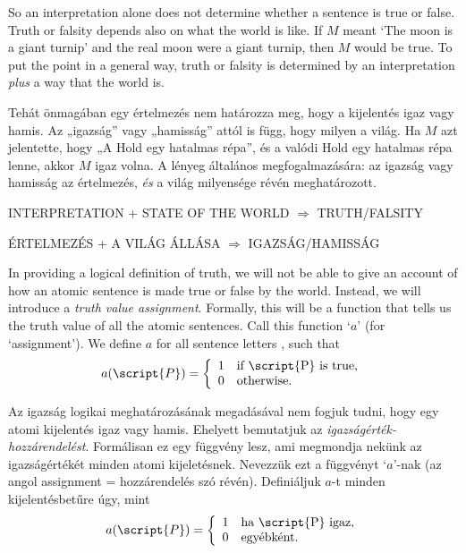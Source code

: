 So an interpretation alone does not determine whether a sentence is true or false. Truth or falsity depends also on what the world is like. If $M$ meant `The moon is a giant turnip' and the real moon were a giant turnip, then $M$ would be true. To put the point in a general way, truth or falsity is determined by an interpretation \emph{plus} a way that the world is.

Tehát önmagában egy értelmezés nem határozza meg, hogy a kijelentés igaz vagy hamis. Az „igazság” vagy „hamisság” attól is függ, hogy milyen a világ. Ha $M$ azt jelentette, hogy „A Hold egy hatalmas répa”, és a valódi Hold egy hatalmas répa lenne, akkor $M$ igaz volna. A lényeg általános megfogalmazására: az igazság vagy hamisság az értelmezés, \emph{és} a világ milyensége révén meghatározott.

\begin{center}
INTERPRETATION + STATE OF THE WORLD $\Longrightarrow$ TRUTH/FALSITY
\end{center}

\begin{center}
ÉRTELMEZÉS + A VILÁG ÁLLÁSA $\Longrightarrow$ IGAZSÁG/HAMISSÁG
\end{center}

In providing a logical definition of truth, we will not be able to give an account of how an atomic sentence is made true or false by the world. Instead, we will introduce a \emph{truth value assignment}. Formally, this will be a function that tells us the truth value of all the atomic sentences. Call this function `$a$' (for `assignment'). We define $a$ for all sentence letters , such that
\begin{displaymath}
a(\script{P}) =
\left\{
	\begin{array}{ll}
	1 & \mbox{if \script{P} is true},\\
	0 & \mbox{otherwise.}
	\end{array}
\right.
\end{displaymath}

Az igazság logikai meghatározásának megadásával nem fogjuk tudni, hogy egy atomi kijelentés igaz vagy hamis. Ehelyett bemutatjuk az \emph{igazságérték-hozzárendelést}. Formálisan ez egy függvény lesz, ami megmondja nekünk az igazságértékét minden atomi kijeletésnek. Nevezzük ezt a függvényt `$a$'-nak (az angol assignment = hozzárendelés szó révén). Definiáljuk $a$-t minden  kijelentésbetűre úgy, mint
\begin{displaymath}
a(\script{P}) =
\left\{
	\begin{array}{ll}
	1 & \mbox{ha \script{P} igaz},\\
	0 & \mbox{egyébként.}
	\end{array}
\right.
\end{displaymath}

